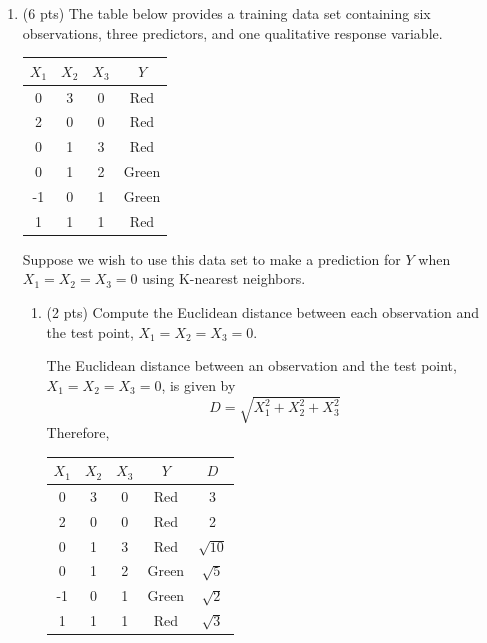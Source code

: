 \documentclass[a4paper]{article}
\theoremstyle{definition}
\newenvironment{soln}{
    \leavevmode\color{blue}\ignorespaces
}{}
\begin{document}
\begin{enumerate}
\begin{enumerate}
	\medskip
\end{enumerate}

\item (6 pts) The table below provides a training data set containing six observations, three predictors, and one qualitative response variable.

\begin{center}
	\begin{tabular}{ c  c  c  c}
		\hline
		$X_{1}$ & $X_{2}$ & $X_{3}$ & $Y$ \\ \hline
		0 & 3 & 0 & Red \\
		2 & 0 & 0 & Red \\
		0 & 1 & 3 & Red \\
		0 & 1 & 2 & Green \\
		-1 & 0 & 1 & Green \\
		1 & 1 & 1 & Red  \\
		\hline
	\end{tabular}
\end{center}

Suppose we wish to use this data set to make a prediction for $Y$ when $X_{1} = X_{2} = X_{3} = 0$ using K-nearest neighbors.

\pagebreak

\begin{enumerate}
	\item (2 pts) Compute the Euclidean distance between each observation and the test point, $X_{1} = X_{2} = X_{3}=0$.
 
	\begin{soln}  
		The Euclidean distance between an observation and the test point, $X_{1} = X_{2} = X_{3}=0$, is given by $$D=\sqrt{X_1^2 + X_2^2 + X_3^2}$$ 
		Therefore, 

		\begin{center}
			\begin{tabular}{ c  c  c  c | c}
				\hline
				$X_{1}$ & $X_{2}$ & $X_{3}$ & $Y$ & $D$ \\ \hline
				0 & 3 & 0 & Red & 3 \\
				2 & 0 & 0 & Red & 2 \\
				0 & 1 & 3 & Red & $\sqrt{10}$ \\
				0 & 1 & 2 & Green & $\sqrt{5}$ \\
				-1 & 0 & 1 & Green & $\sqrt{2}$ \\
				1 & 1 & 1 & Red  & $\sqrt{3}$ \\
				\hline
			\end{tabular}
		\end{center}
	\end{soln}
 

\end{enumerate}
\end{enumerate}
\end{document}
